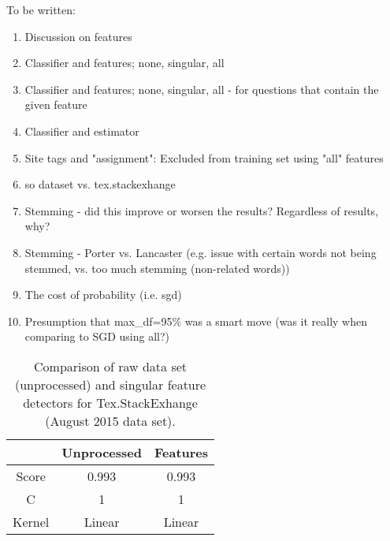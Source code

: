 To be written:
\begin{enumerate}
	\item Discussion on features
	\item Classifier and features; none, singular, all
	\item Classifier and features; none, singular, all - for questions that contain the given feature
	\item Classifier and estimator
	\item Site tags and "assignment": Excluded from training set using "all" features
	\item \gls{so} dataset vs. tex.stackexhange
	\item Stemming - did this improve or worsen the results? Regardless of results, why?
	\item Stemming - Porter vs. Lancaster (e.g. issue with certain words not being stemmed, vs. too much stemming (non-related words))
	\item The cost of probability (i.e. \gls{sgd})
	\item Presumption that max\_df=95\% was a smart move (was it really when comparing to SGD using all?)
\end{enumerate}


\begin{table}[!h]%
	\centering
	\begin{tabular}{| c | c | c |}
		\hline
		~ 			& Unprocessed		& Features	\\ \hline
		Score 		& 0.993				& 0.993		\\ \hline
		C			& 1					& 1			\\ \hline
		Kernel		& Linear			& Linear	\\ \hline
	\end{tabular}
	\caption{Comparison of raw data set (unprocessed) and singular feature detectors for Tex.StackExhange (August 2015 data set).}
	\label{tab:singular_feature_detector_tex}
\end{table}



